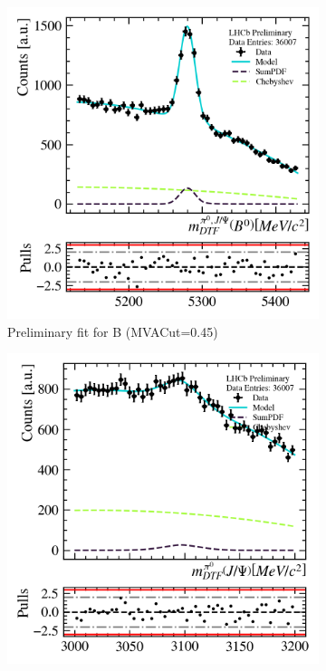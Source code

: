 \begin{figure}
    \begin{subfigure}{0.49\textwidth}
        \includegraphics[width=\textwidth]{./OutputFiles/PNGPlots/PreliminaryFit/MVAScan/b1dfit_mva0.45_jpsichannel.png}
        \caption*{Preliminary fit for B (MVACut=0.45)}
        \label{fig:prefit_mvascan_mvacut040_b}
    \end{subfigure}
    \begin{subfigure}{0.49\textwidth}
        \includegraphics[width=\textwidth]{./OutputFiles/PNGPlots/PreliminaryFit/MVAScan/jpsi1dfit_mva0.45_jpsichannel.png}

\end{subfigure}
\end{figure}
